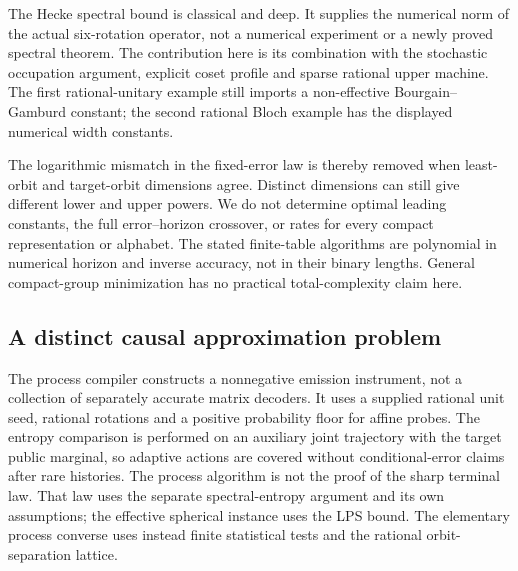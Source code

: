 The Hecke spectral bound \cite{LPS61,PLP61pre} is classical and deep.
It supplies the numerical norm of the actual six-rotation operator,
not a numerical experiment or a newly proved spectral theorem.
The contribution here is its combination with the stochastic
occupation argument, explicit coset profile and sparse rational upper
machine. The first rational-unitary example still imports a
non-effective Bourgain--Gamburd constant; the second rational Bloch
example has the displayed numerical width constants.

The logarithmic mismatch in the fixed-error law is thereby removed
when least-orbit and target-orbit dimensions agree. Distinct dimensions
can still give different lower and upper powers. We do not determine
optimal leading constants, the full error--horizon crossover, or rates
for every compact representation or alphabet. The stated finite-table
algorithms are polynomial in numerical horizon and inverse accuracy,
not in their binary lengths. General compact-group minimization has no
practical total-complexity claim here.

\subsection{A distinct causal approximation problem}
The process compiler constructs a nonnegative emission instrument, not
a collection of separately accurate matrix decoders. It uses a supplied
rational unit seed, rational rotations and a positive probability floor
for affine probes. The entropy comparison is performed on an auxiliary
joint trajectory with the target public marginal, so adaptive actions
are covered without conditional-error claims after rare histories.
The process algorithm is not the proof of the sharp terminal law.
That law uses the separate spectral-entropy argument and its own
assumptions; the effective spherical instance uses the LPS bound. The elementary process converse uses instead
finite statistical tests and the rational orbit-separation lattice.
